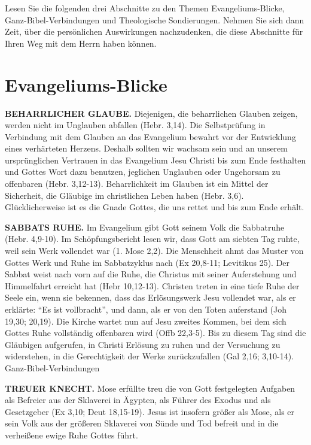 \documentclass[]{book}
\begin{document}
Lesen Sie die folgenden drei Abschnitte zu den Themen
Evangeliums-Blicke, Ganz-Bibel-Verbindungen und Theologische
Sondierungen. Nehmen Sie sich dann Zeit, über die persönlichen
Auswirkungen nachzudenken, die diese Abschnitte für Ihren Weg mit dem
Herrn haben können.

\section{Evangeliums-Blicke}\label{evangeliums-blicke}

\textbf{BEHARRLICHER GLAUBE.} Diejenigen, die beharrlichen Glauben
zeigen, werden nicht im Unglauben abfallen (Hebr. 3,14). Die
Selbstprüfung in Verbindung mit dem Glauben an das Evangelium bewahrt
vor der Entwicklung eines verhärteten Herzens. Deshalb sollten wir
wachsam sein und an unserem ursprünglichen Vertrauen in das Evangelium
Jesu Christi bis zum Ende festhalten und Gottes Wort dazu benutzen,
jeglichen Unglauben oder Ungehorsam zu offenbaren (Hebr. 3,12-13).
Beharrlichkeit im Glauben ist ein Mittel der Sicherheit, die Gläubige im
christlichen Leben haben (Hebr. 3,6). Glücklicherweise ist es die Gnade
Gottes, die uns rettet und bis zum Ende erhält.

\textbf{SABBATS RUHE.} Im Evangelium gibt Gott seinem Volk die
Sabbatruhe (Hebr. 4,9-10). Im Schöpfungsbericht lesen wir, dass Gott am
siebten Tag ruhte, weil sein Werk vollendet war (1. Mose 2,2). Die
Menschheit ahmt das Muster von Gottes Werk und Ruhe im Sabbatzyklus nach
(Ex 20,8-11; Levitikus 25). Der Sabbat weist nach vorn auf die Ruhe, die
Christus mit seiner Auferstehung und Himmelfahrt erreicht hat (Hebr
10,12-13). Christen treten in eine tiefe Ruhe der Seele ein, wenn sie
bekennen, dass das Erlösungswerk Jesu vollendet war, als er erklärte:
``Es ist vollbracht'', und dann, als er von den Toten auferstand (Joh
19,30; 20,19). Die Kirche wartet nun auf Jesu zweites Kommen, bei dem
sich Gottes Ruhe vollständig offenbaren wird (Offb 22,3-5). Bis zu
diesem Tag sind die Gläubigen aufgerufen, in Christi Erlösung zu ruhen
und der Versuchung zu widerstehen, in die Gerechtigkeit der Werke
zurückzufallen (Gal 2,16; 3,10-14). Ganz-Bibel-Verbindungen

\textbf{TREUER KNECHT.} Mose erfüllte treu die von Gott festgelegten
Aufgaben als Befreier aus der Sklaverei in Ägypten, als Führer des
Exodus und als Gesetzgeber (Ex 3,10; Deut 18,15-19). Jesus ist insofern
größer als Mose, als er sein Volk aus der größeren Sklaverei von Sünde
und Tod befreit und in die verheißene ewige Ruhe Gottes führt.
\end{document}
